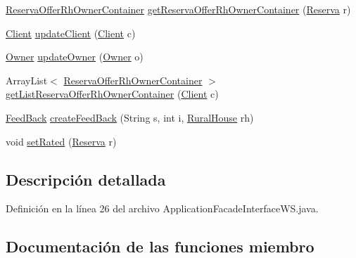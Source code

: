 \begin{DoxyCompactItemize}
\item 
\mbox{\hyperlink{classdomain_1_1_reserva_offer_rh_owner_container}{Reserva\+Offer\+Rh\+Owner\+Container}} \mbox{\hyperlink{interfacebusiness_logic_1_1_application_facade_interface_w_s_a2f7ed5fbb8427eee05fdaa0a0dc9348b}{get\+Reserva\+Offer\+Rh\+Owner\+Container}} (\mbox{\hyperlink{classdomain_1_1_reserva}{Reserva}} r)
\item 
\mbox{\hyperlink{classdomain_1_1_client}{Client}} \mbox{\hyperlink{interfacebusiness_logic_1_1_application_facade_interface_w_s_a2d053769d923bd1987f8fd1f875905e7}{update\+Client}} (\mbox{\hyperlink{classdomain_1_1_client}{Client}} c)
\item 
\mbox{\hyperlink{classdomain_1_1_owner}{Owner}} \mbox{\hyperlink{interfacebusiness_logic_1_1_application_facade_interface_w_s_af0ef759ffef69a39428870eada0221cd}{update\+Owner}} (\mbox{\hyperlink{classdomain_1_1_owner}{Owner}} o)
\item 
Array\+List$<$ \mbox{\hyperlink{classdomain_1_1_reserva_offer_rh_owner_container}{Reserva\+Offer\+Rh\+Owner\+Container}} $>$ \mbox{\hyperlink{interfacebusiness_logic_1_1_application_facade_interface_w_s_ab07e66746b2cfe14622bdd16c295ce93}{get\+List\+Reserva\+Offer\+Rh\+Owner\+Container}} (\mbox{\hyperlink{classdomain_1_1_client}{Client}} c)
\item 
\mbox{\hyperlink{classdomain_1_1_feed_back}{Feed\+Back}} \mbox{\hyperlink{interfacebusiness_logic_1_1_application_facade_interface_w_s_a3fd4fdf7b7efaef7ff89ee7273f5be22}{create\+Feed\+Back}} (String s, int i, \mbox{\hyperlink{classdomain_1_1_rural_house}{Rural\+House}} rh)
\item 
void \mbox{\hyperlink{interfacebusiness_logic_1_1_application_facade_interface_w_s_a0092e0a845b7b23dc504be013ce1958a}{set\+Rated}} (\mbox{\hyperlink{classdomain_1_1_reserva}{Reserva}} r)
\end{DoxyCompactItemize}


\subsection{Descripción detallada}


Definición en la línea 26 del archivo Application\+Facade\+Interface\+W\+S.\+java.



\subsection{Documentación de las funciones miembro}
\mbox{\label{interfacebusiness_logic_1_1_application_facade_interface_w_s_ad5cf462151e6c43b9088f112eed0ad3f}} 
